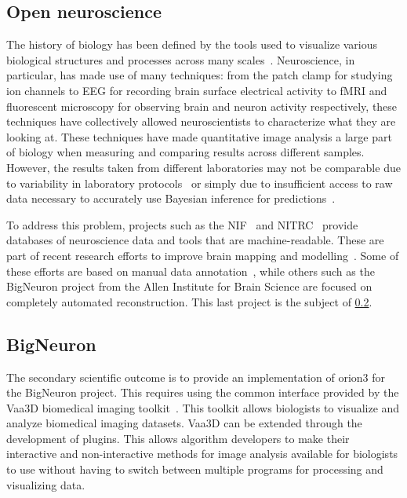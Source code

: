 \subsection{Open neuroscience}
The history of biology has been defined by the tools used to
visualize various biological structures and processes across many
scales~\autocite{moore2012visualizing}. Neuroscience, in particular, has
made use of many techniques: from the patch clamp for studying ion
channels to \acrshort{EEG} for recording brain surface electrical
activity to \acrshort{fMRI} and fluorescent microscopy for
observing brain and neuron activity respectively, these techniques
have collectively allowed neuroscientists to characterize what
they are looking at.  These techniques have made quantitative
image analysis a large part of biology when measuring and
comparing results across different samples. However, the results
taken from different laboratories may not be comparable due to
variability in laboratory protocols~\autocite{NeuroMorphVariability:Parekh:2015}
or simply due to insufficient access to raw data necessary
to accurately use Bayesian inference for
predictions~\autocite{Poldrack2011}.

To address this problem, projects such as the \acrfull{NIF}~\autocite{Gardner2008}
and \acrfull{NITRC}~\autocite{Kennedy2016} provide databases of neuroscience data
and tools that are machine-readable. These are part of recent research efforts
to improve brain mapping and modelling~\autocite{Markram2013,BigBrainIEEESpectrum:2013}.
Some of these efforts are based on manual data annotation~\autocite{Ascoli2007,Helmstaedter2011,Helmstaedter2012,Marx2013},
while others such as the BigNeuron project from the Allen Institute for
Brain Science are focused on completely automated reconstruction. This last
project is the subject of \cref{subsec:bigneuron}.

\subsection{BigNeuron}\label{subsec:bigneuron}

The secondary scientific outcome is to provide an implementation of
\gls{orion3} for the BigNeuron project. This requires using the common
interface provided by the Vaa3D biomedical imaging
toolkit~\autocite{Vaa3D:site:2015,Vaa3D:Peng:2010,Vaa3D:Peng:2014}.  This
toolkit allows biologists to visualize and analyze biomedical imaging datasets.
Vaa3D can be extended through the development of plugins. This allows algorithm
developers to make their interactive and non-interactive methods for image
analysis available for biologists to use without having to switch between
multiple programs for processing and visualizing data.

